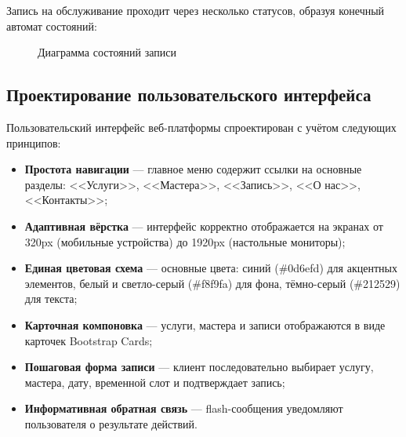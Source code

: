 \documentclass[14pt,a4paper,oneside]{extarticle}
\begin{document}
Запись на обслуживание проходит через несколько статусов, образуя конечный автомат состояний:

\begin{figure}[H]
\centering
{}
\caption{Диаграмма состояний записи}\label{fig:booking_states}
\end{figure}

\subsection{Проектирование пользовательского интерфейса}

Пользовательский интерфейс веб-платформы спроектирован с учётом следующих принципов:
\begin{itemize}[leftmargin=2cm]
    \item \textbf{Простота навигации} --- главное меню содержит ссылки на основные разделы: <<Услуги>>, <<Мастера>>, <<Запись>>, <<О нас>>, <<Контакты>>;
    \item \textbf{Адаптивная вёрстка} --- интерфейс корректно отображается на экранах от 320px (мобильные устройства) до 1920px (настольные мониторы);
    \item \textbf{Единая цветовая схема} --- основные цвета: синий (\#0d6efd) для акцентных элементов, белый и светло-серый (\#f8f9fa) для фона, тёмно-серый (\#212529) для текста;
    \item \textbf{Карточная компоновка} --- услуги, мастера и записи отображаются в виде карточек Bootstrap Cards;
    \item \textbf{Пошаговая форма записи} --- клиент последовательно выбирает услугу, мастера, дату, временной слот и подтверждает запись;
    \item \textbf{Информативная обратная связь} --- flash-сообщения уведомляют пользователя о результате действий.
\end{itemize}
\end{document}
